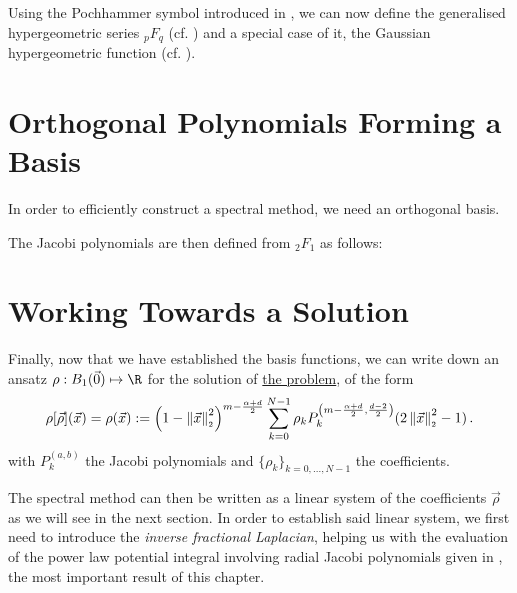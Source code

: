 Using the Pochhammer symbol introduced in , we can now define the generalised hypergeometric series ${}_pF_q$ (cf. ) and a special case of it, the Gaussian hypergeometric function (cf. ).



\pagebreak
\section{Orthogonal Polynomials Forming a Basis}
In order to efficiently construct a spectral method, we need an orthogonal basis.



The Jacobi polynomials are then defined from ${}_2F_1$ as follows:

% 
% 


\section{Working Towards a Solution}
Finally, now that we have established the basis functions, we can write down an ansatz $\rho: B_1(\vec{0}) \mapsto \R$ for the solution of \hyperref[def:the-problem]{the problem}, of the form
\begin{equation}
  \rho[\vec{\rho}](\vec{x}) = \rho(\vec{x}) := \left(1-\left\lVert\vec{x}\right\rVert_{\scriptscriptstyle 2}^{2}\right)^{m - \frac{\alpha + d}{2}} \sum_{k=0}^{N-1} \rho_k P_{k}^{\left(m - \frac{\alpha + d}{2},\frac{d-2}{2}\right)}(2 \left\lVert\vec{x}\right\rVert_{\scriptscriptstyle 2}^{2}-1)\,.
  \label{eq:ansatz}
\end{equation}
with $P_k^{(a, b)}$ the Jacobi polynomials and $\{\rho_k\}_{k=0, ..., N-1}$ the coefficients.

The spectral method can then be written as a linear system of the coefficients $\vec{\rho}$ as we will see in the next section.
In order to establish said linear system, we first need to introduce the \textit{inverse fractional Laplacian}, helping us with the evaluation of the power law potential integral involving radial Jacobi polynomials given in , the most important result of this chapter.

